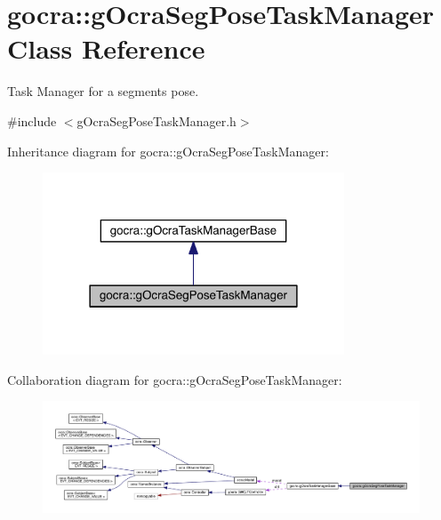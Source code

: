 \hypertarget{classgocra_1_1gOcraSegPoseTaskManager}{}\section{gocra\+:\+:g\+Ocra\+Seg\+Pose\+Task\+Manager Class Reference}
\label{classgocra_1_1gOcraSegPoseTaskManager}


Task Manager for a segment\textquotesingle{}s pose.  




{\ttfamily \#include $<$g\+Ocra\+Seg\+Pose\+Task\+Manager.\+h$>$}



Inheritance diagram for gocra\+:\+:g\+Ocra\+Seg\+Pose\+Task\+Manager\+:\nopagebreak
\begin{figure}[H]
\begin{center}
\leavevmode
\includegraphics[width=254pt]{da/df2/classgocra_1_1gOcraSegPoseTaskManager__inherit__graph}
\end{center}
\end{figure}


Collaboration diagram for gocra\+:\+:g\+Ocra\+Seg\+Pose\+Task\+Manager\+:\nopagebreak
\begin{figure}[H]
\begin{center}
\leavevmode
\includegraphics[width=350pt]{d2/ddc/classgocra_1_1gOcraSegPoseTaskManager__coll__graph}
\end{center}
\end{figure}
